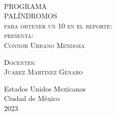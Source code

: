 \begin{titlepage}
\begin{minipage}[c][0.81\textheight][t]{0.75\textwidth}
\begin{center}
      {\color{red}{\large\scshape Titulo del Reporte }}\\[.2in]

      \vspace{2cm}            

      \textsc{\LARGE P\hspace{0.5cm}R\hspace{0.5cm}O\hspace{0.5cm}G\hspace{0.5cm}R\hspace{0.5cm}A\hspace{0.5cm}M\hspace{0.5cm}A\hspace{0.5cm}}\\[1cm]
      \textsc{\LARGE P\hspace{0.5cm}A\hspace{0.5cm}L\hspace{0.5cm}Í\hspace{0.5cm}N\hspace{0.5cm}D\hspace{0.5cm}R\hspace{0.5cm}O\hspace{0.5cm}M\hspace{0.5cm}O\hspace{0.5cm}S\hspace{0.5cm}}
      \\[2cm]
      \textsc{\large para obtener un 10 en el reporte:}\\[0.5cm]
      
      {\color{red}\textsc{\large presenta:}}\\[0.5cm]
      \textsc{\large {Connor Urbano Mendoza}}\\[1cm]          

      \vspace{0.5cm}

      {\large\scshape 
        {\color{red}Docentes:}\\[0.3cm] {Juarez Martinez Genaro}}\\[.2in]

      \vspace{1cm}

      \large{Estados Unidos Mexicanos\\ 
        Ciudad de México\\
        2023}
    \end{center}
  \end{minipage}
\end{titlepage}
